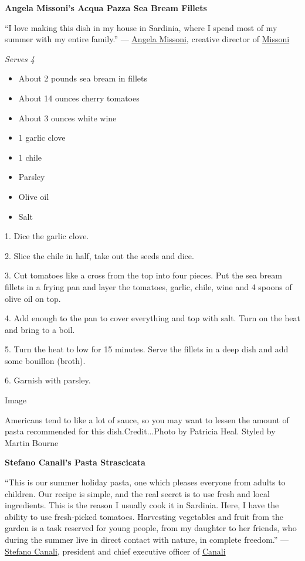 \textbf{Angela Missoni's Acqua Pazza Sea Bream Fillets}

``I love making this dish in my house in Sardinia, where I spend most of
my summer with my entire family.'' ---
\href{https://www.nytimes3xbfgragh.onion/2018/08/14/t-magazine/angela-missoni-fashion-designer-inspiration.html}{Angela
Missoni}, creative director of
\href{https://www.missoni.com/us}{Missoni}

\emph{Serves 4}

\begin{itemize}
\item
  About 2 pounds sea bream in fillets
\item
  About 14 ounces cherry tomatoes
\item
  About 3 ounces white wine
\item
  1 garlic clove
\item
  1 chile
\item
  Parsley
\item
  Olive oil
\item
  Salt
\end{itemize}

1. Dice the garlic clove.

2. Slice the chile in half, take out the seeds and dice.

3. Cut tomatoes like a cross from the top into four pieces. Put the sea
bream fillets in a frying pan and layer the tomatoes, garlic, chile,
wine and 4 spoons of olive oil on top.

4. Add enough to the pan to cover everything and top with salt. Turn on
the heat and bring to a boil.

5. Turn the heat to low for 15 minutes. Serve the fillets in a deep dish
and add some bouillon (broth).

6. Garnish with parsley.

Image

Americans tend to like a lot of sauce, so you may want to lessen the
amount of pasta recommended for this dish.Credit...Photo by Patricia
Heal. Styled by Martin Bourne

\textbf{Stefano Canali's Pasta Strascicata}

``This is our summer holiday pasta, one which pleases everyone from
adults to children. Our recipe is simple, and the real secret is to use
fresh and local ingredients. This is the reason I usually cook it in
Sardinia. Here, I have the ability to use fresh-picked tomatoes.
Harvesting vegetables and fruit from the garden is a task reserved for
young people, from my daughter to her friends, who during the summer
live in direct contact with nature, in complete freedom.'' ---
\href{https://www.forbes.com/sites/josephdeacetis/2019/07/17/how-canali-menswear-uses-innovation-to-achieve-aesthetic-perfection-as-consumers-evolve/\#47c383ca295e}{Stefano
Canali}, president and chief executive officer of
\href{https://www.canali.com/en_us/homepage.html}{Canali}

